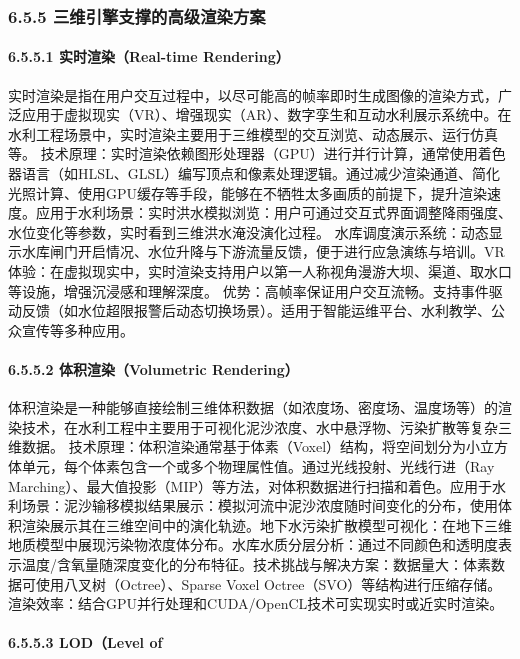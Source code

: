 {{{{{{{{{{\subsubsection{6.5.5
三维引擎支撑的高级渲染方案}\label{ux4e09ux7ef4ux5f15ux64ceux652fux6491ux7684ux9ad8ux7ea7ux6e32ux67d3ux65b9ux6848} \paragraph{6.5.5.1
实时渲染（Real-time Rendering）}\label{ux5b9eux65f6ux6e32ux67d3real-time-rendering}
实时渲染是指在用户交互过程中，以尽可能高的帧率即时生成图像的渲染方式，广泛应用于虚拟现实（VR）、增强现实（AR）、数字孪生和互动水利展示系统中。在水利工程场景中，实时渲染主要用于三维模型的交互浏览、动态展示、运行仿真等。
技术原理：实时渲染依赖图形处理器（GPU）进行并行计算，通常使用着色器语言（如HLSL、GLSL）编写顶点和像素处理逻辑。通过减少渲染通道、简化光照计算、使用GPU缓存等手段，能够在不牺牲太多画质的前提下，提升渲染速度。应用于水利场景：实时洪水模拟浏览：用户可通过交互式界面调整降雨强度、水位变化等参数，实时看到三维洪水淹没演化过程。
水库调度演示系统：动态显示水库闸门开启情况、水位升降与下游流量反馈，便于进行应急演练与培训。VR体验：在虚拟现实中，实时渲染支持用户以第一人称视角漫游大坝、渠道、取水口等设施，增强沉浸感和理解深度。
优势：高帧率保证用户交互流畅。支持事件驱动反馈（如水位超限报警后动态切换场景）。适用于智能运维平台、水利教学、公众宣传等多种应用。 \paragraph{6.5.5.2 体积渲染（Volumetric
Rendering）}\label{ux4f53ux79efux6e32ux67d3volumetric-rendering}
体积渲染是一种能够直接绘制三维体积数据（如浓度场、密度场、温度场等）的渲染技术，在水利工程中主要用于可视化泥沙浓度、水中悬浮物、污染扩散等复杂三维数据。
技术原理：体积渲染通常基于体素（Voxel）结构，将空间划分为小立方体单元，每个体素包含一个或多个物理属性值。通过光线投射、光线行进（Ray
Marching）、最大值投影（MIP）等方法，对体积数据进行扫描和着色。应用于水利场景：泥沙输移模拟结果展示：模拟河流中泥沙浓度随时间变化的分布，使用体积渲染展示其在三维空间中的演化轨迹。地下水污染扩散模型可视化：在地下三维地质模型中展现污染物浓度体分布。水库水质分层分析：通过不同颜色和透明度表示温度/含氧量随深度变化的分布特征。技术挑战与解决方案：数据量大：体素数据可使用八叉树（Octree）、Sparse
Voxel Octree（SVO）等结构进行压缩存储。渲染效率：结合GPU并行处理和CUDA/OpenCL技术可实现实时或近实时渲染。 \paragraph{6.5.5.3 LOD（Level of
}}}}}}}}}}}
